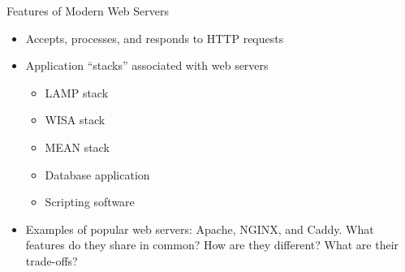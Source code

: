 \documentclass[14pt,aspectratio=169]{beamer}
\begin{document}
%
\begin{frame}{Features of Modern Web Servers}
  \begin{itemize}
    \item Accepts, processes, and responds to HTTP requests
      \vspace*{-.1in}
    \item Application ``stacks'' associated with web servers
      \begin{itemize}
        \item LAMP stack
        \item WISA stack
        \item MEAN stack
        \item Database application
        \item Scripting software
      \end{itemize}
      \vspace*{-.2in}
    \item Examples of popular web servers: Apache, NGINX, and Caddy. What
      features do they share in common? How are they different? What are their
      trade-offs?
  \end{itemize}
\end{frame}
\end{document}
